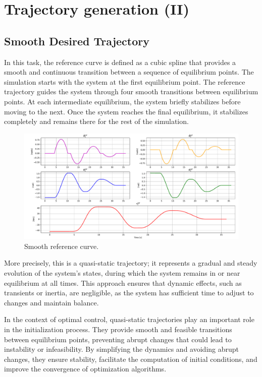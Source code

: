 \chapter{Trajectory generation (II)}
\section{Smooth Desired Trajectory}
In this task, the reference curve is defined as a cubic spline that provides a smooth and continuous transition between a sequence of equilibrium points. The simulation starts with the system at the first equilibrium point. The reference trajectory guides the system through four smooth transitions between equilibrium points. At each intermediate equilibrium, the system briefly stabilizes before moving to the next. Once the system reaches the final equilibrium, it stabilizes completely and remains there for the rest of the simulation.
\begin{figure}[htb]
    \includegraphics[width=1\linewidth]{img/2-task2/References.pdf}
    \caption{Smooth reference curve.}
    \label{fig:tau1-evolution}
\end{figure}


More precisely, this is a quasi-static trajectory; it represents a gradual and steady evolution of the system's states, during which the system remains in or near equilibrium at all times. This approach ensures that dynamic effects, such as transients or inertia, are negligible, as the system has sufficient time to adjust to changes and maintain balance.

In the context of optimal control, quasi-static trajectories play an important role in the initialization process. They provide smooth and feasible transitions between equilibrium points, preventing abrupt changes that could lead to instability or infeasibility. By simplifying the dynamics and avoiding abrupt changes, they ensure stability, facilitate the computation of initial conditions, and improve the convergence of optimization algorithms.

